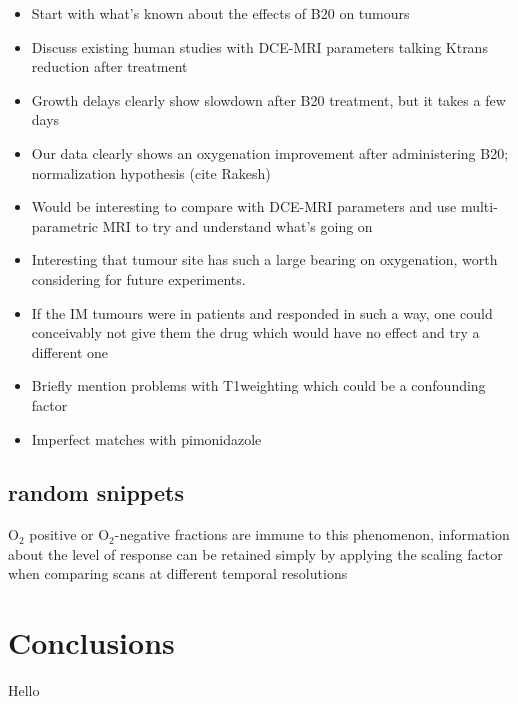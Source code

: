 \begin{itemize}
    \item Start with what's known about the effects of B20 on tumours
    \item Discuss existing human studies with DCE-MRI parameters talking Ktrans reduction after treatment
    \item Growth delays clearly show slowdown after B20 treatment, but it takes a few days
    \item Our data clearly shows an oxygenation improvement after administering B20; normalization hypothesis (cite Rakesh)
    \item Would be interesting to compare with DCE-MRI parameters and use multi-parametric MRI to try and understand what's going on 
    \item Interesting that tumour site has such a large bearing on oxygenation, worth considering for future experiments. 
    \item If the IM tumours were in patients and responded in such a way, one could conceivably not give them the drug which would have no effect and try a different one
    \item Briefly mention problems with T1weighting which could be a confounding factor
    \item Imperfect matches with pimonidazole
\end{itemize}

\subsection{random snippets}
O$_2$ positive or O$_2$-negative fractions are immune to this phenomenon, information about the level of response can be retained simply by applying the scaling factor when comparing scans at different temporal resolutions


\section{Conclusions}
Hello


